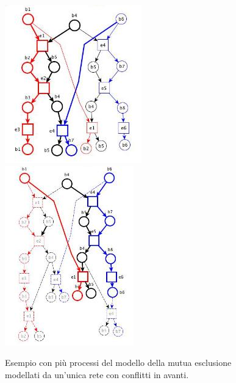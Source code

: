 \begin{figure}[H]
  \centering
  \includegraphics[scale = 0.6]{img/be4.jpg}
  \includegraphics[scale = 0.6]{img/be5.jpg} 
  \caption{Esempio con più processi del modello della mutua esclusione
    modellati da un’unica rete con conflitti in avanti.}
\end{figure}
